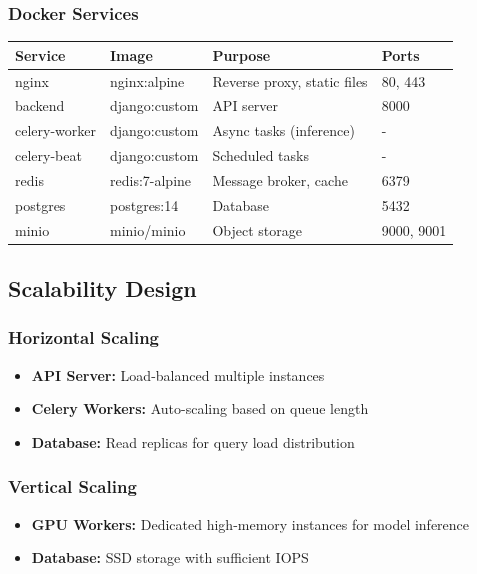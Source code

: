 \documentclass[12pt,a4paper]{article}
\begin{document}
\subsubsection{Docker Services}

\begin{table}[H]
\centering
\begin{tabularx}{\textwidth}{|l|l|X|l|}
\hline
\textbf{Service} & \textbf{Image} & \textbf{Purpose} & \textbf{Ports} \\
\hline
nginx & nginx:alpine & Reverse proxy, static files & 80, 443 \\
\hline
backend & django:custom & API server & 8000 \\
\hline
celery-worker & django:custom & Async tasks (inference) & - \\
\hline
celery-beat & django:custom & Scheduled tasks & - \\
\hline
redis & redis:7-alpine & Message broker, cache & 6379 \\
\hline
postgres & postgres:14 & Database & 5432 \\
\hline
minio & minio/minio & Object storage & 9000, 9001 \\
\hline
\end{tabularx}
\end{table}

\subsection{Scalability Design}

\subsubsection{Horizontal Scaling}
\begin{itemize}
    \item \textbf{API Server:} Load-balanced multiple instances
    \item \textbf{Celery Workers:} Auto-scaling based on queue length
    \item \textbf{Database:} Read replicas for query load distribution
\end{itemize}

\subsubsection{Vertical Scaling}
\begin{itemize}
    \item \textbf{GPU Workers:} Dedicated high-memory instances for model inference
    \item \textbf{Database:} SSD storage with sufficient IOPS
\end{itemize}
\end{document}
